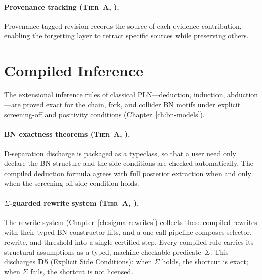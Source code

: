\paragraph{Provenance tracking (\textsc{Tier~A}, \claimCore{}).}
Provenance-tagged revision records the source of each evidence
contribution, enabling the forgetting layer to retract specific sources
while preserving others.



\section{Compiled Inference}
\label{sec:covers-compiled}

The extensional inference rules of classical PLN---deduction,
induction, abduction---are proved exact for the chain, fork, and
collider BN motifs under explicit screening-off and positivity
conditions (Chapter~\ref{ch:bn-models}).

\paragraph{BN exactness theorems (\textsc{Tier~A}, \claimConditional{}).}
D-separation discharge is packaged as a typeclass, so that a user need
only declare the BN structure and the side conditions are checked
automatically.  The compiled deduction formula agrees with full posterior
extraction when and only when the screening-off side condition holds.

\paragraph{$\Sigma$-guarded rewrite system
  (\textsc{Tier~A}, \claimConditional{}).}
The rewrite system (Chapter~\ref{ch:sigma-rewrites}) collects these
compiled rewrites with their typed BN constructor lifts, and a one-call
pipeline composes selector, rewrite, and threshold into a single
certified step.  Every compiled rule carries its structural assumptions as
a typed, machine-checkable predicate~$\Sigma$.  This discharges
\textbf{D5} (Explicit Side Conditions): when $\Sigma$ holds, the
shortcut is exact; when $\Sigma$ fails, the shortcut is not licensed.

